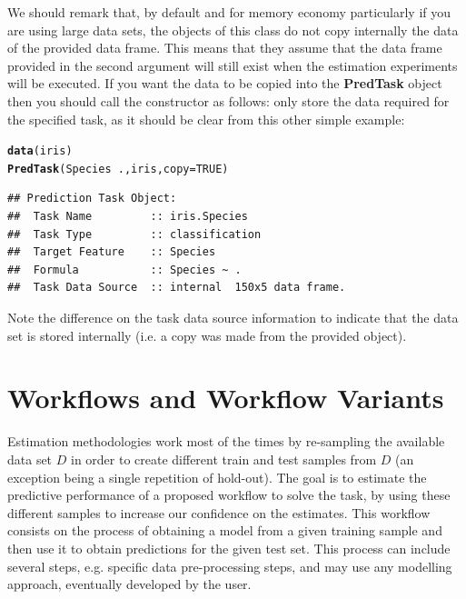 \documentclass[10pt,a4paper]{article}\usepackage[]{graphicx}\usepackage[]{color}
\makeatletter
\newcommand{\hlnum}[1]{\textcolor[rgb]{0.686,0.059,0.569}{#1}}%
\newcommand{\hlopt}[1]{\textcolor[rgb]{0,0,0}{#1}}%
\newcommand{\hlstd}[1]{\textcolor[rgb]{0.345,0.345,0.345}{#1}}%
\newcommand{\hlkwc}[1]{\textcolor[rgb]{0.333,0.667,0.333}{#1}}%
\newcommand{\hlkwd}[1]{\textcolor[rgb]{0.737,0.353,0.396}{\textbf{#1}}}%
\newenvironment{kframe}{%
 \def\at@end@of@kframe{}%
 \ifinner\ifhmode%
  \def\at@end@of@kframe{\end{minipage}}%
  \begin{minipage}{\columnwidth}%
 \fi\fi%
 \def\FrameCommand##1{\hskip\@totalleftmargin \hskip-\fboxsep
 \colorbox{shadecolor}{##1}\hskip-\fboxsep
     \hskip-\linewidth \hskip-\@totalleftmargin \hskip\columnwidth}%
 \MakeFramed {\advance\hsize-\width
   \@totalleftmargin\z@ \linewidth\hsize
   \@setminipage}}%
 {\par\unskip\endMakeFramed%
 \at@end@of@kframe}
\newenvironment{knitrout}{}{} %
\makeatother
\begin{document}
We should remark that, by default and for memory economy particularly if you are using large data sets, the objects of this class do not copy internally the data of the provided data frame. This  means that they assume that the data frame provided in the second argument will still exist when the estimation experiments will be executed. If you want the data to be copied into the \textbf{PredTask} object then you should call the constructor as follows:
only store the data
required for the specified task, as it should be clear from this other
simple example:

\begin{knitrout}\footnotesize
{}\color{fgcolor}\begin{kframe}
\begin{alltt}
\hlkwd{data}\hlstd{(iris)}
\hlkwd{PredTask}\hlstd{(Species} \hlopt{~} \hlstd{.,iris,}\hlkwc{copy}\hlstd{=}\hlnum{TRUE}\hlstd{)}
\end{alltt}
\begin{verbatim}
## Prediction Task Object:
## 	Task Name         :: iris.Species 
## 	Task Type         :: classification 
## 	Target Feature    :: Species 
## 	Formula           :: Species ~ .
## 	Task Data Source  :: internal  150x5 data frame.
\end{verbatim}
\end{kframe}
\end{knitrout}

Note the difference on the task data source information to indicate that the data set is stored internally (i.e. a copy was made from the provided object). 

\section{Workflows and Workflow Variants}

Estimation methodologies work most of the times by re-sampling the
available data set $D$ in order to create different train and test
samples from $D$ (an exception being a single repetition of hold-out). The goal is to estimate the predictive performance
of a proposed workflow to solve the task, by using these different
samples to increase our confidence on the estimates. This workflow
consists on the process of obtaining a model from a given training
sample and then use it to obtain predictions for the given test
set. This process can include several steps, e.g. specific data
pre-processing steps, and may use any modelling approach, eventually
developed  by the user. 
\end{document}

